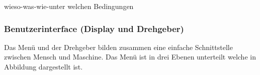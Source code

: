 wieso-was-wie-unter welchen Bedingungen
\subsubsection{Benutzerinterface (Display und Drehgeber)}

Das Menü und der Drehgeber bilden zusammen eine einfache Schnittstelle zwischen Mensch und Maschine. Das Menü ist in drei Ebenen unterteilt welche in Abbildung  dargestellt ist.











